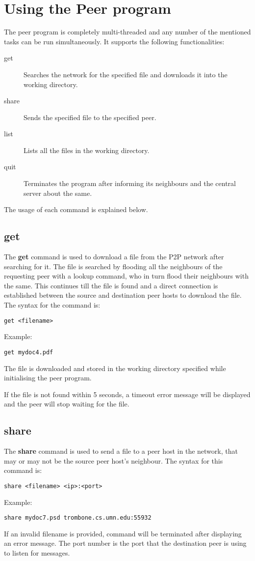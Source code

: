 \documentclass[12pt,twosided,a4paper]{article}
\numberwithin{equation}{section} %
\numberwithin{figure}{section} %
\numberwithin{table}{section} %
\begin{document}
\section{Using the Peer program}
The peer program is completely multi-threaded and any number of the mentioned
tasks can be run simultaneously. It supports the following functionalities:
\begin{description}
	\item[get] Searches the network for the specified file and downloads it into
	the working directory.
	\item[share] Sends the specified file to the specified peer.
	\item[list] Lists all the files in the working directory.
	\item[quit] Terminates the program after informing its neighbours and the
	central server about the same.
\end{description}
The usage of each command is explained below.
\subsection{get}
The \textbf{get} command is used to download a file from the P2P network after
searching for it. The file is searched by flooding all the neighbours of the requesting
peer with a lookup command, who in turn flood their neighbours with the same.
This continues till the file is found and a direct connection is established
between the source and destination peer hosts to download the file. The syntax
for the command is:
\begin{lstlisting}
get <filename>
\end{lstlisting}
Example:
\begin{lstlisting}
get mydoc4.pdf
\end{lstlisting}
The file is downloaded and stored in the working directory specified while
initialising the peer program.

If the file is not found within 5 seconds, a timeout error message will be
displayed and the peer will stop waiting for the file.

\subsection{share}
The \textbf{share} command is used to send a file to a peer host in the network,
that may or may not be the source peer host's neighbour. The syntax for this
command is:
\begin{lstlisting}
share <filename> <ip>:<port>
\end{lstlisting}
Example:
\begin{lstlisting}
share mydoc7.psd trombone.cs.umn.edu:55932
\end{lstlisting}
If an invalid filename is provided, command will be terminated after displaying
an error message. The port number is the port that the destination peer is using
to listen for messages.
\end{document}

